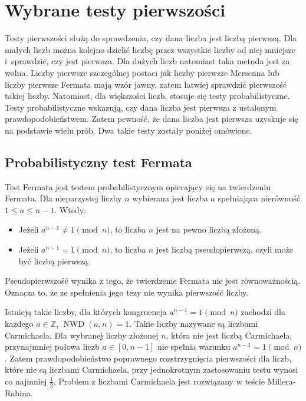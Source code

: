 \documentclass[12pt,twoside,a4]{mwbk}
\theoremstyle{definition}
\DeclareMathOperator{\NWD}{NWD}
\begin{document}
\section{Wybrane testy pierwszości}
Testy pierwszości służą do sprawdzenia, czy dana liczba jest liczbą pierwszą. Dla małych liczb można kolejno dzielić liczbę przez wszystkie liczby od niej mniejsze i~sprawdzić, czy jest pierwsza. Dla dużych liczb natomiast taka metoda jest za wolna. Liczby pierwsze szczególnej postaci jak liczby pierwsze Mersenna lub liczby pierwsze Fermata mają wzór jawny, zatem łatwiej sprawdzić pierwszość takiej liczby. Natomiast, dla większości liczb, stosuje się testy probabilistyczne. Testy probabilistyczne wskazują, czy dana liczba jest pierwsza z ustalonym prawdopodobieństwem. Zatem pewność, że dana liczba jest pierwsza uzyskuje się na podstawie wielu prób. Dwa takie testy zostały poniżej omówione.
 
\subsection{Probabilistyczny test Fermata {\cite{handbook}}}
Test Fermata jest testem probabilistycznym opierający się na twierdzeniu Fermata. Dla nieparzystej liczby $n$ wybierana jest liczba $a$ spełniająca nierówność $1 \leq a \leq n-1$. Wtedy:
\begin{itemize}
\item Jeżeli $a^{n-1} \neq 1 \pmod{n}$, to liczba $n$ jest na pewno liczbą złożoną.
\item Jeżeli $a^{n-1} = 1 \pmod{n}$, to liczba $n$ jest liczbą pseudopierwszą, czyli może być liczbą pierwszą.
\end{itemize}
Pseudopierwszość wynika z tego, że twierdzenie Fermata nie jest równoważnością. Oznacza to, że ze spełnienia jego tezy nie wynika pierwszość liczby. \\ \par
Istnieją takie liczby, dla których kongruencja $a^{n-1} = 1 \pmod{n}$ zachodzi dla każdego $a \in \mathbb{Z}$, $\NWD(a,n)=1$. Takie liczby nazywane są liczbami Carmichaela. Dla wybranej liczby złożonej $n$, która nie jest liczbą Carmichaela, przynajmniej połowa liczb $a \in [0, n-1]$ nie spełnia warunku $a^{n-1} = 1 \pmod{n}$. Zatem prawdopodobieństwo poprawnego rozstrzygnięcia pierwszości dla liczb, które nie są liczbami Carmichaela, przy jednokrotnym zastosowaniu testu wynosi co najmniej $\frac{1}{2}$. Problem z liczbami Carmichaela jest rozwiązany w teście Millera-Rabina.
\end{document}
